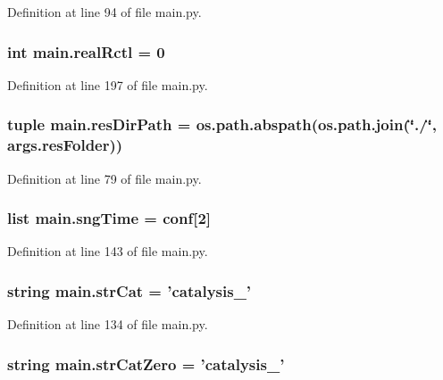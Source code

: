 Definition at line 94 of file main.\-py.

\hypertarget{a00122_a2dcb93d1b24fce96491e031528ed43c0}{
\subsubsection[{real\-Rctl}]{\setlength{\rightskip}{0pt plus 5cm}int main.\-real\-Rctl = 0}}\label{a00122_a2dcb93d1b24fce96491e031528ed43c0}


Definition at line 197 of file main.\-py.

\hypertarget{a00122_a93d7d68ada532b3cedaab103283ab91a}{
\subsubsection[{res\-Dir\-Path}]{\setlength{\rightskip}{0pt plus 5cm}tuple main.\-res\-Dir\-Path = os.\-path.\-abspath(os.\-path.\-join(\char`\"{}./\char`\"{}, args.\-res\-Folder))}}\label{a00122_a93d7d68ada532b3cedaab103283ab91a}


Definition at line 79 of file main.\-py.

\hypertarget{a00122_ab4296f1ae2e4c4bb597ca27e84849510}{
\subsubsection[{sng\-Time}]{\setlength{\rightskip}{0pt plus 5cm}list main.\-sng\-Time = {\bf conf}\mbox{[}2\mbox{]}}}\label{a00122_ab4296f1ae2e4c4bb597ca27e84849510}


Definition at line 143 of file main.\-py.

\hypertarget{a00122_ab12df661b7defb4d7077777ad7d6352d}{
\subsubsection[{str\-Cat}]{\setlength{\rightskip}{0pt plus 5cm}string main.\-str\-Cat = 'catalysis\-\_\-'}}\label{a00122_ab12df661b7defb4d7077777ad7d6352d}


Definition at line 134 of file main.\-py.

\hypertarget{a00122_a6bb1e2c0e0d0a9e63313c082ee4eec76}{
\subsubsection[{str\-Cat\-Zero}]{\setlength{\rightskip}{0pt plus 5cm}string main.\-str\-Cat\-Zero = 'catalysis\-\_\-'}}\label{a00122_a6bb1e2c0e0d0a9e63313c082ee4eec76}


